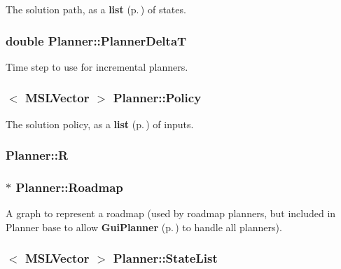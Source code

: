 The solution path, as a {\bf list} {\rm (p.\,\pageref{classlist})} of states.

\subsubsection{\setlength{\rightskip}{0pt plus 5cm}double Planner::Planner\-Delta\-T}\label{classPlanner_m14}


Time step to use for incremental planners.

\subsubsection{$<$ {\bf MSLVector} $>$ Planner::Policy}\label{classPlanner_m3}


The solution policy, as a {\bf list} {\rm (p.\,\pageref{classlist})} of inputs.

\subsubsection{ Planner::R\hspace{0.3cm}{\tt  [protected]}}\label{classPlanner_n0}


\subsubsection{ $\ast$ Planner::Roadmap}\label{classPlanner_m9}


A graph to represent a roadmap (used by roadmap planners, but included in Planner base to allow {\bf Gui\-Planner} {\rm (p.\,\pageref{classGuiPlanner})} to handle all planners).

\subsubsection{$<$ {\bf MSLVector} $>$ Planner::State\-List}\label{classPlanner_m11}


